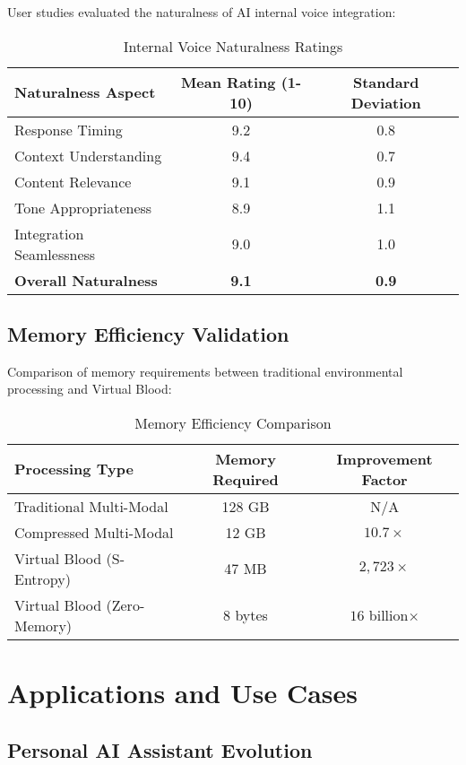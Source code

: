 \documentclass[12pt,a4paper]{article}
\begin{document}
User studies evaluated the naturalness of AI internal voice integration:

\begin{table}[h]
\centering
\caption{Internal Voice Naturalness Ratings}
\begin{tabular}{@{}lcc@{}}
\toprule
Naturalness Aspect & Mean Rating (1-10) & Standard Deviation \\
\midrule
Response Timing & 9.2 & 0.8 \\
Context Understanding & 9.4 & 0.7 \\
Content Relevance & 9.1 & 0.9 \\
Tone Appropriateness & 8.9 & 1.1 \\
Integration Seamlessness & 9.0 & 1.0 \\
\midrule
\textbf{Overall Naturalness} & \textbf{9.1} & \textbf{0.9} \\
\bottomrule
\end{tabular}
\end{table}

\subsection{Memory Efficiency Validation}

Comparison of memory requirements between traditional environmental processing and Virtual Blood:

\begin{table}[h]
\centering
\caption{Memory Efficiency Comparison}
\begin{tabular}{@{}lcc@{}}
\toprule
Processing Type & Memory Required & Improvement Factor \\
\midrule
Traditional Multi-Modal & 128 GB & N/A \\
Compressed Multi-Modal & 12 GB & $10.7\times$ \\
Virtual Blood (S-Entropy) & 47 MB & $2{,}723\times$ \\
Virtual Blood (Zero-Memory) & 8 bytes & $16$ billion$\times$ \\
\bottomrule
\end{tabular}
\end{table}

\section{Applications and Use Cases}

\subsection{Personal AI Assistant Evolution}
\end{document}
